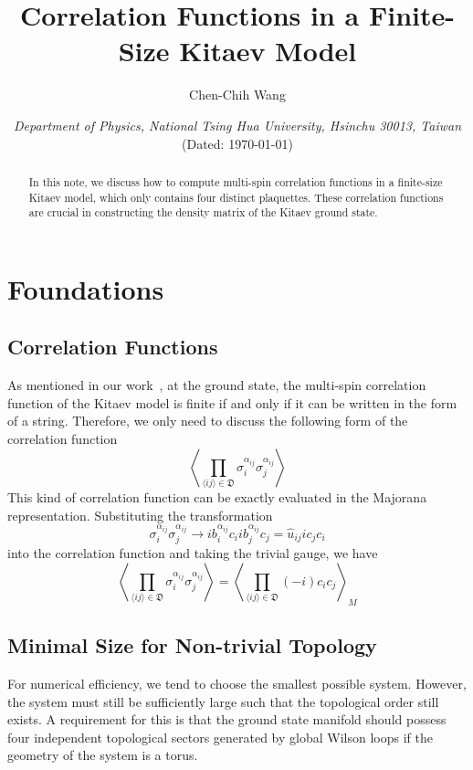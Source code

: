 \documentclass[12font]{article}
\title{\textbf{Correlation Functions in a Finite-Size Kitaev Model}}
\author{Chen-Chih Wang  }
\date{\textit{Department of Physics, National Tsing Hua University, Hsinchu 30013, Taiwan} \\ (Dated: \today)}
\theoremstyle{definition}
\newcommand{\anglelr}[1]{\langle #1 \rangle}
\newcommand{\Anglelr}[1]{\left\langle #1 \right\rangle}
\newcommand{\dimer}[2]{\sigma_{#1}^{\alpha_{#1#2}}\sigma_{#2}^{\alpha_{#1#2}}}
\begin{document}
\maketitle
\renewcommand\qedsymbol{$\blacksquare$}



\fontsize{12pt}{16pt}\selectfont

\begin{abstract}
    In this note, we discuss how to compute multi-spin correlation functions in a finite-size Kitaev model, which only contains four distinct plaquettes. These correlation functions are crucial in constructing the density matrix of the Kitaev ground state.
\end{abstract}

\tableofcontents

\section{Foundations}

\subsection{Correlation Functions}
As mentioned in our work~\cite{wang2026exactorganizationdensitymatrices}, at the ground state, the multi-spin correlation function of the Kitaev model is finite if and only if it can be written in the form of a string. Therefore, we only need to discuss the following form of the correlation function
\[
\Anglelr{
    \prod_{\anglelr{ij}\in\mathfrak{D}}
    \dimer{i}{j}
}
\]
This kind of correlation function can be exactly evaluated in the Majorana representation. Substituting the transformation 
\[
\dimer{i}{j} \to i b^{\alpha_{ij}}_i c_i  i b^{\alpha_{ij}}_j c_j = \hat{u}_{ij} ic_jc_i
\]
into the correlation function and taking the trivial gauge, we have
\[
\Anglelr{
    \prod_{\anglelr{ij}\in\mathfrak{D}}
    \dimer{i}{j}
}
=
\Anglelr{
    \prod_{\anglelr{ij}\in\mathfrak{D}}
    (-i) c_ic_j
}_M
\]

\subsection{Minimal Size for Non-trivial Topology}
For numerical efficiency, we tend to choose the smallest possible system. However, the system must still be sufficiently large such that the topological order still exists. A requirement for this is that the ground state manifold should possess four independent topological sectors generated by global Wilson loops if the geometry of the system is a torus.
\end{document}
